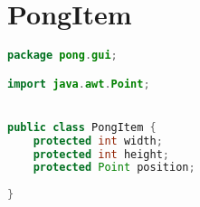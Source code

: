\section{PongItem}
\begin{lstlisting}[language=Java]
package pong.gui;

import java.awt.Point;


public class PongItem {
	protected int width;
	protected int height;
	protected Point position;
	
}
\end{lstlisting}